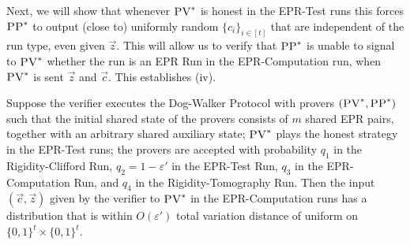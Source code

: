 \documentclass{toc}
\newcommand{\eps}{\varepsilon}
\newcommand{\pv}{\textsc{PV}}
\newcommand{\pp}{\textsc{PP}}
\begin{document}
Next, we will show that whenever $\pv^*$ is honest in the EPR-Test runs this forces $\pp^*$ to output (close to) uniformly random $\{c_i\}_{i\in [t]}$ that are independent of the run type, even given $\vec{z}$. This will allow us to verify that $\pp^*$ is unable to signal to $\pv^*$ whether the run is an EPR Run in the EPR-Computation run, when $\pv^*$ is sent $\vec{z}$ and $\vec{c}$. This establishes (iv). 


\begin{lemma}\label{lem:ci-unif}
Suppose the verifier executes the Dog-Walker Protocol with provers $(\pv^*,\pp^*)$ such that the initial shared state of the provers consists of $m$ shared EPR pairs, together with an arbitrary shared auxiliary state; $\pv^*$ plays the honest strategy in the EPR-Test runs; the provers are accepted with probability $q_1$ in the Rigidity-Clifford Run, $q_2 = 1-\eps'$ in the EPR-Test Run, $q_3$ in the EPR-Computation Run, and $q_4$ in the Rigidity-Tomography Run. Then the input $(\vec{c},\vec{z})$ given by the verifier to $\pv^*$ in the EPR-Computation runs has a distribution that is within $O(\eps')$ total variation distance of uniform on $\{0,1\}^t\times\{0,1\}^t$. 
\end{lemma}
\end{document}
